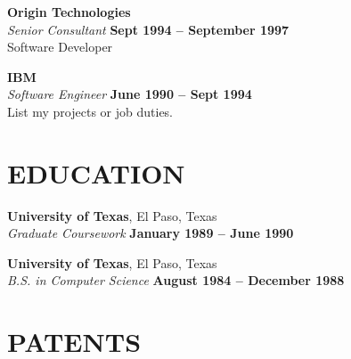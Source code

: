 \documentclass[margin,line]{resume}
\begin{document}
\begin{resume}
    \textbf{\listing Origin Technologies} \vspace{2mm}\\\vspace{1mm}%
    \textsl{Senior Consultant} \hfill \textbf{Sept 1994 -- September 1997}\\
    Software Developer
    
    \textbf{\listing IBM} \vspace{2mm}\\\vspace{1mm}%
    \textsl{Software Engineer} \hfill \textbf{June 1990 -- Sept 1994}\\
    List my projects or job duties.
    

    \vspace{-1mm}

\sectionline


    \section{\mysidestyle \textbf{\large{E}\small{DUCATION}}}

    \textbf{\listing University of Texas}, El Paso, Texas \vspace{1mm}\\
    \textsl{Graduate Coursework} \hfill \textbf{January 1989 -- June 1990}\vspace{-3mm}\\\vspace{-1mm}%

    \textbf{\listing University of Texas}, El Paso, Texas \vspace{1mm}\\
    \textsl{B.S. in Computer Science} \hfill \textbf{August 1984 -- December 1988}\vspace{-3mm}\\\vspace{-1mm}%

    \vspace{-1mm}

\sectionline

    \section{\mysidestyle \textbf{\large{P}\small{ATENTS}}}


\end{resume}
\end{document}
